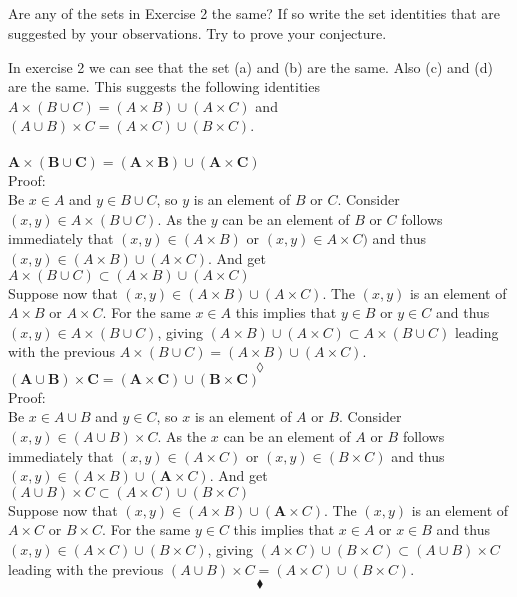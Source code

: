 \subsection{}
\begin{tcolorbox}
Are any of the sets in Exercise 2 the same? If so write the set identities that are suggested by your observations. Try to prove your conjecture.
\end{tcolorbox}
In exercise 2 we can see that the set (a) and (b) are the same. Also (c) and (d) are the same. This suggests the following identities $A\times (B\cup C)=(A\times B)\cup(A\times C)$ and $(A\cup B)\times C=(A\times C)\cup(B\times C)$. \\\\
$\mathbf{A\times (B\cup C)=(A\times B)\cup(A\times C)}$\\
Proof:\\
Be $x\in A$ and $ y\in B\cup C$, so $y$ is an element of $B$ or $C$. Consider $(x,y)\in A\times (B\cup C)$. As the $y$ can be an element of $B$ or $C$  follows immediately that $(x,y)\in (A\times B)$ or $(x,y)\in A\times C)$ and thus  $(x,y)\in (A\times B)\cup(A\times C)$. And get $A\times (B\cup C)\subset(A\times B)\cup(A\times C)$ \\
Suppose now that $(x,y)\in (A\times B)\cup(A\times C)$. The $(x,y)$ is an element of $A\times B$ or $A\times C$. For the same $x\in A$ this implies that $y\in B$ or $y\in C$ and thus $(x,y) \in A\times (B\cup C)$, giving $(A\times B)\cup(A\times C)\subset A\times (B\cup C)$ leading with the previous  $A\times (B\cup C)=(A\times B)\cup(A\times C)$.
$$\lozenge$$
$\mathbf{(A\cup B)\times C=(A\times C)\cup(B\times C)}$\\
Proof:\\
Be $x\in A\cup B $ and $ y\in  C$, so $x$ is an element of $A$ or $B$. Consider $(x,y)\in(A\cup B)\times C$. As the $x$ can be an element of $A$ or $B$  follows immediately that $(x,y)\in (A\times C)$ or $(x,y)\in (B\times C)$ and thus  $(x,y)\in (A\times B)\cup(\textbf{A}\times C)$. And get $(A\cup B)\times C\subset(A\times C)\cup(B\times C)$ \\
Suppose now that $(x,y)\in (A\times B)\cup(\textbf{A}\times C)$. The $(x,y)$ is an element of $A\times C$ or $B\times C$. For the same $y\in C$ this implies that $x\in A$ or $x\in B$ and thus $(x,y) \in (A\times C)\cup(B\times C)$, giving $(A\times C)\cup(B\times C)\subset (A\cup B)\times C$ leading with the previous  $(A\cup B)\times C=(A\times C)\cup(B\times C)$.
$$\blacklozenge$$

